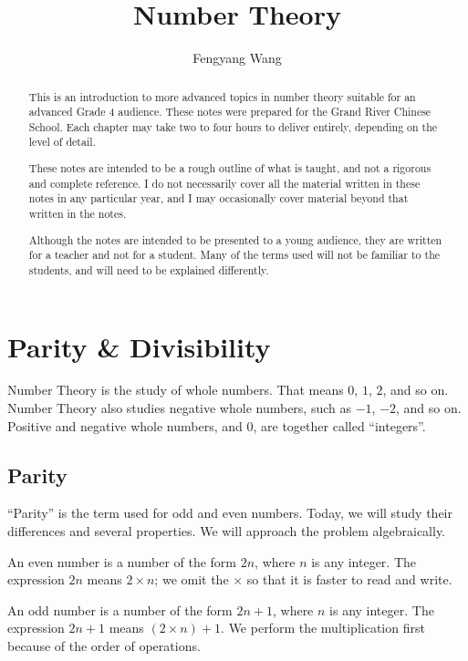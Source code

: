 \documentclass[a4paper,10pt]{report}
\title{Number Theory}
\author{Fengyang Wang}
\begin{document}
\begin{abstract}

 This is an introduction to more advanced topics in number theory suitable for
 an advanced Grade 4 audience. These notes were prepared for the Grand River
 Chinese School. Each chapter may take two to four hours to deliver entirely,
 depending on the level of detail.

 These notes are intended to be a rough outline of what is taught, and not a
 rigorous and complete reference. I do not necessarily cover all the material
 written in these notes in any particular year, and I may occasionally cover
 material beyond that written in the notes.

 Although the notes are intended to be presented to a young audience, they are
 written for a teacher and not for a student. Many of the terms used will not be
 familiar to the students, and will need to be explained differently.

\end{abstract}

\maketitle

\tableofcontents

\chapter{Parity \& Divisibility}

Number Theory is the study of whole numbers. That means $0$, $1$, $2$, and so
on. Number Theory also studies negative whole numbers, such as $-1$, $-2$, and
so on. Positive and negative whole numbers, and $0$, are together called
``integers''.

\section{Parity}

``Parity'' is the term used for odd and even numbers. Today, we will study their
differences and several properties. We will approach the problem algebraically.

An even number is a number of the form $2n$, where $n$ is any integer. The
expression $2n$ means $2\times n$; we omit the $\times$ so that it is faster to
read and write.

An odd number is a number of the form $2n+1$, where $n$ is any integer. The
expression $2n+1$ means $(2\times n) + 1$. We perform the multiplication first
because of the order of operations.
\end{document}
